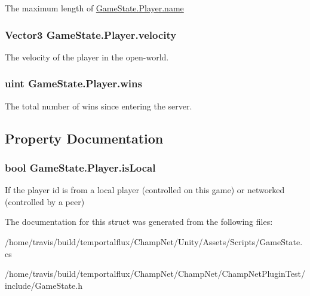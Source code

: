 The maximum length of \hyperlink{class_game_state_1_1_player_afc2b145df544ca5bffc7c87ef294bcde}{Game\-State.\-Player.\-name} 

\hypertarget{class_game_state_1_1_player_aa22122c85cfdae428d82bd1571ab022a}{
\subsubsection[{velocity}]{\setlength{\rightskip}{0pt plus 5cm}Vector3 Game\-State.\-Player.\-velocity}}\label{class_game_state_1_1_player_aa22122c85cfdae428d82bd1571ab022a}


The velocity of the player in the open-\/world. 

\hypertarget{class_game_state_1_1_player_a3a4d13459cad9bd58e058ddc6387af70}{
\subsubsection[{wins}]{\setlength{\rightskip}{0pt plus 5cm}uint Game\-State.\-Player.\-wins}}\label{class_game_state_1_1_player_a3a4d13459cad9bd58e058ddc6387af70}


The total number of wins since entering the server. 



\subsection{Property Documentation}
\hypertarget{class_game_state_1_1_player_affd7c601a6d763dafdc59a58c415e9e7}{
\subsubsection[{is\-Local}]{\setlength{\rightskip}{0pt plus 5cm}bool Game\-State.\-Player.\-is\-Local\hspace{0.3cm}{\ttfamily [get]}}}\label{class_game_state_1_1_player_affd7c601a6d763dafdc59a58c415e9e7}


If the player id is from a local player (controlled on this game) or networked (controlled by a peer) 



The documentation for this struct was generated from the following files\-:\begin{DoxyCompactItemize}
\item 
/home/travis/build/temportalflux/\-Champ\-Net/\-Unity/\-Assets/\-Scripts/Game\-State.\-cs\item 
/home/travis/build/temportalflux/\-Champ\-Net/\-Champ\-Net/\-Champ\-Net\-Plugin\-Test/include/Game\-State.\-h\end{DoxyCompactItemize}
